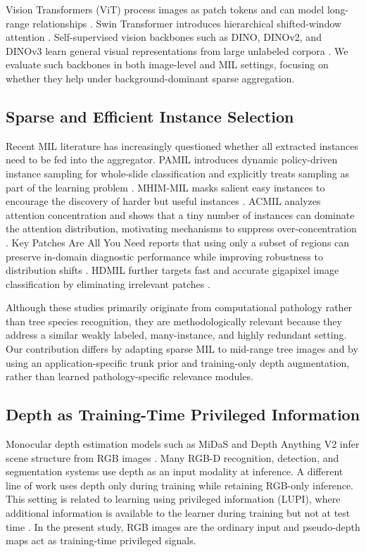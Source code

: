 \documentclass{ieeeaccess}
\begin{document}
Vision Transformers (ViT) process images as patch tokens and can model long-range relationships
\cite{vit}. Swin Transformer introduces hierarchical shifted-window attention \cite{swin}.
Self-supervised vision backbones such as DINO, DINOv2, and DINOv3 learn general visual
representations from large unlabeled corpora \cite{dino,dinov2,dinov3}. We evaluate such backbones
in both image-level and MIL settings, focusing on whether they help under background-dominant sparse
aggregation.

\subsection{Sparse and Efficient Instance Selection}
Recent MIL literature has increasingly questioned whether all extracted instances need to be fed
into the aggregator. PAMIL introduces dynamic policy-driven instance sampling for whole-slide
classification and explicitly treats sampling as part of the learning problem \cite{pamil}. MHIM-MIL
masks salient easy instances to encourage the discovery of harder but useful instances \cite{mhim}.
ACMIL analyzes attention concentration and shows that a tiny number of instances can dominate the
attention distribution, motivating mechanisms to suppress over-concentration \cite{acmil}. Key
Patches Are All You Need reports that using only a subset of regions can preserve in-domain
diagnostic performance while improving robustness to distribution shifts \cite{keypatches}. HDMIL
further targets fast and accurate gigapixel image classification by eliminating irrelevant patches
\cite{hdmil}.

Although these studies primarily originate from computational pathology rather than tree species
recognition, they are methodologically relevant because they address a similar weakly labeled,
many-instance, and highly redundant setting. Our contribution differs by adapting sparse MIL to
mid-range tree images and by using an application-specific trunk prior and training-only depth
augmentation, rather than learned pathology-specific relevance modules.

\subsection{Depth as Training-Time Privileged Information}
Monocular depth estimation models such as MiDaS and Depth Anything V2 infer scene structure from RGB
images \cite{midas,depthanythingv2}. Many RGB-D recognition, detection, and segmentation systems use
depth as an input modality at inference. A different line of work uses depth only during training
while retaining RGB-only inference. This setting is related to learning using privileged information
(LUPI), where additional information is available to the learner during training but not at test
time \cite{lupi}. In the present study, RGB images are the ordinary input and pseudo-depth maps act
as training-time privileged signals.
\end{document}
